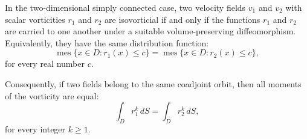 In the two-dimensional simply connected case, two velocity fields $v_1$ and $v_2$ with scalar vorticities $r_1$ and $r_2$ are isovorticial if and only if the functions $r_1$ and $r_2$ are carried to one another under a suitable volume-preserving diffeomorphism. Equivalently, they have the same distribution function:
$$\operatorname{mes}\{x \in D: r_1(x) \leq c\} = \operatorname{mes}\{x \in D: r_2(x) \leq c\},$$
for every real number $c$.

Consequently, if two fields belong to the same coadjoint orbit, then all moments of the vorticity are equal:
$$\int_D r_1^k \, dS = \int_D r_2^k \, dS,$$
for every integer $k \geq 1$.
